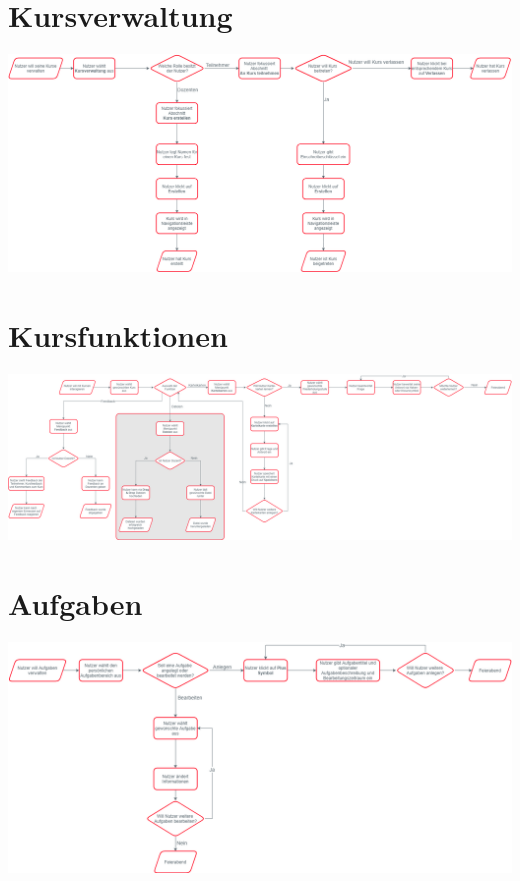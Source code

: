 \section{Kursverwaltung}
	\begin{center}
		\includegraphics[width=\linewidth, keepaspectratio, angle= 90]{img/Prozesse/coursemanagement}
	\end{center}
\section{Kursfunktionen}
	\begin{center}
		\includegraphics[width=\linewidth, keepaspectratio, angle= 90]{img/Prozesse/coursefunction}
	\end{center}
\section{Aufgaben}
	\begin{center}
		\includegraphics[width=\linewidth, keepaspectratio, angle= 90]{img/Prozesse/tasks}
	\end{center}
